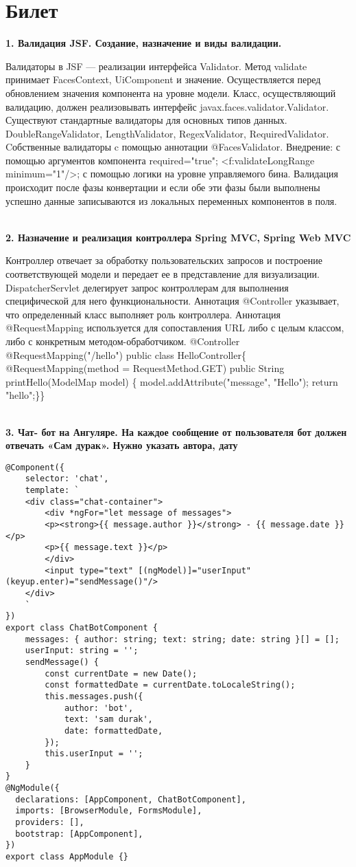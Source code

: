 \documentclass{article}
\newcommand{\bil}[5]{%
        \section{Билет}
        \textbf{1. #1}

        #4
        \\
        \textbf{2. #2}
        
        #5
        \\
        \textbf{3. #3}
}
\begin{document}
\bil{Валидация JSF. Создание, назначение и виды валидации.}
{Назначение и реализация контроллера Spring MVC, Spring Web MVC}
{Чат- бот на Ангуляре. На каждое сообщение от пользователя бот должен отвечать «Сам дурак». Нужно указать автора, дату }{
    Валидаторы в JSF — реализации интерфейса Validator. Метод validate принимает FacesContext, UiComponent и значение. Осуществляется перед обновлением значения компонента на уровне модели. Класс, осуществляющий валидацию, должен реализовывать интерфейс javax.faces.validator.Validator. Существуют стандартные валидаторы для основных типов данных. DoubleRangeValidator, LengthValidator, RegexValidator, RequiredValidator. Cобственные валидаторы c помощью аннотации @FacesValidator.
    Внедрение: с помощью аргументов компонента required="true"; <f:validateLongRange minimum="1"/>; с помощью логики на уровне управляемого бина.
    Валидация происходит после фазы конвертации и если обе эти фазы были выполнены успешно данные записываются из локальных переменных компонентов в поля.
}{
    Контроллер отвечает за обработку пользовательских запросов и построение соответствующей модели и передает ее в представление для визуализации.
DispatcherServlet делегирует запрос контроллерам для выполнения специфической для него функциональности. 
Аннотация @Controller указывает, что определенный класс выполняет роль контроллера. 
Аннотация @RequestMapping используется для сопоставления URL либо с целым классом, либо с конкретным методом-обработчиком.
@Controller
@RequestMapping("/hello")
public class HelloController\{
   @RequestMapping(method = RequestMethod.GET)
   public String printHello(ModelMap model) \{
      model.addAttribute("message", "Hello");
      return "hello";\}\}
}
\begin{lstlisting}[frame=single, basicstyle=\ttfamily, breaklines=true, breakatwhitespace=true, postbreak=\mbox{\textcolor{red}{$\hookrightarrow$}\space}]
@Component({
    selector: 'chat',
    template: `
    <div class="chat-container">
        <div *ngFor="let message of messages">
        <p><strong>{{ message.author }}</strong> - {{ message.date }}</p>
        <p>{{ message.text }}</p>
        </div>
        <input type="text" [(ngModel)]="userInput" (keyup.enter)="sendMessage()"/>
    </div>
    `
})
export class ChatBotComponent {
    messages: { author: string; text: string; date: string }[] = [];
    userInput: string = '';
    sendMessage() {
        const currentDate = new Date();
        const formattedDate = currentDate.toLocaleString();
        this.messages.push({
            author: 'bot',
            text: 'sam durak',
            date: formattedDate,
        });
        this.userInput = '';
    }
}
@NgModule({
  declarations: [AppComponent, ChatBotComponent],
  imports: [BrowserModule, FormsModule],
  providers: [],
  bootstrap: [AppComponent],
})
export class AppModule {}
\end{lstlisting}
\end{document}
